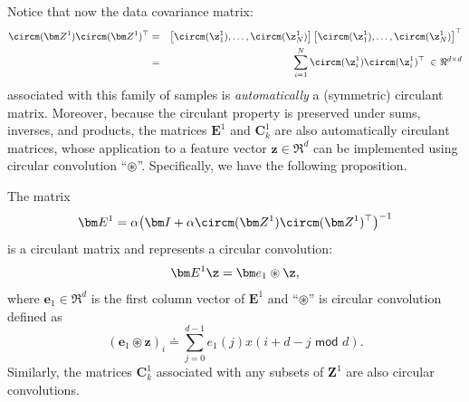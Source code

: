 \documentclass[../../book-main.tex]{subfiles}
\begin{document}
Notice that now the data covariance matrix: 
\begin{eqnarray}
\circm(\bm Z^1) \circm(\bm Z^1)^\top 
&=& \left[ \circm(\z_{1}^1), \dots, \circm(\z_{N}^1) \right] \left[ \circm(\z_{1}^1), \dots, \circm (\z_{N}^1) \right]^\top \nonumber \\
&=& \sum_{i =1}^N \circm(\z_{i}^1) \circm(\z_{i}^1)^\top \;\in \Re^{d\times d} 
\end{eqnarray}
associated with this family of samples is {\em automatically} a (symmetric) circulant matrix. Moreover, because the circulant property is preserved under sums, inverses, and products, the matrices $\bm E^1$ and $\bm C^1_k$ are also automatically circulant matrices, whose application to a feature vector $\bm z \in \Re^d$ can be implemented using circular convolution ``$\circledast$''.
Specifically, we have the following proposition. 

\begin{proposition}
The matrix 
\begin{equation}
    \bm E^1 = \alpha\big(\bm I + \alpha \circm(\bm Z^1) \circm(\bm Z^1)^\top \big)^{-1}
\end{equation}
is a circulant matrix and represents a circular convolution: 
$$\bm E^1 \z = \bm e_1 \circledast \z,$$ 
where $\bm e_1 \in \Re^d$ is the first column vector of $\bm E^1$ and ``$\circledast$'' is circular convolution defined as
\begin{equation*}
    (\bm e_1 \circledast \bm z)_{i} \doteq \sum_{j=0}^{d-1} e_1(j) x(i+ d-j \,\, \textsf{mod} \,\,d).
\end{equation*}
Similarly, the matrices $\bm C^1_k$ associated with any subsets of $\bm Z^1$ are also circular convolutions. 
\label{prop:circular-conv-1}
\end{proposition}
\end{document}
